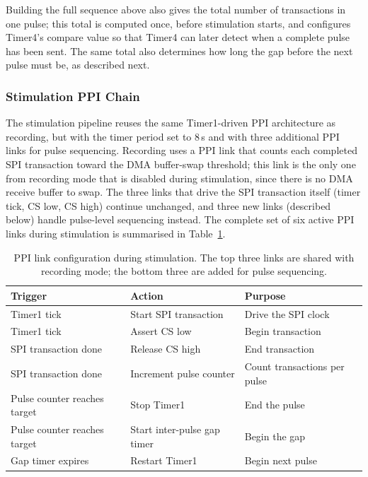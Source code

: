 Building the full sequence above also gives the total number of transactions in
one pulse; this total is computed once, before stimulation starts, and configures
Timer4's compare value so that Timer4 can later detect when a complete pulse has
been sent. The same total also determines how long the gap before the next pulse
must be, as described next.

\subsubsection{Stimulation PPI Chain}
\label{sec:stim_ppi}

The stimulation pipeline reuses the same Timer1-driven PPI architecture as
recording, but with the timer period set to 8\,\textmu{}s and with three
additional PPI links for pulse sequencing. Recording uses a PPI link that counts
each completed SPI transaction toward the DMA buffer-swap threshold; this link is
the only one from recording mode that is disabled during stimulation, since there
is no DMA receive buffer to swap. The three links that drive the SPI transaction
itself (timer tick, CS low, CS high) continue unchanged, and three new links
(described below) handle pulse-level sequencing instead. The complete set of six
active PPI links during stimulation is summarised in Table~\ref{tab:ppi_stim}.

\begin{table}[htbp]
\centering
\caption{PPI link configuration during stimulation. The top three links are
shared with recording mode; the bottom three are added for pulse sequencing.}
\label{tab:ppi_stim}
\begin{tabular}{lll}
\toprule
\textbf{Trigger}              & \textbf{Action}               & \textbf{Purpose} \\
\midrule
Timer1 tick                   & Start SPI transaction         & Drive the SPI clock \\
Timer1 tick                   & Assert CS low                 & Begin transaction \\
SPI transaction done          & Release CS high               & End transaction \\
\midrule
SPI transaction done          & Increment pulse counter       & Count transactions per pulse \\
Pulse counter reaches target  & Stop Timer1                   & End the pulse \\
Pulse counter reaches target  & Start inter-pulse gap timer   & Begin the gap \\
Gap timer expires             & Restart Timer1                & Begin next pulse \\
\bottomrule
\end{tabular}
\end{table}

